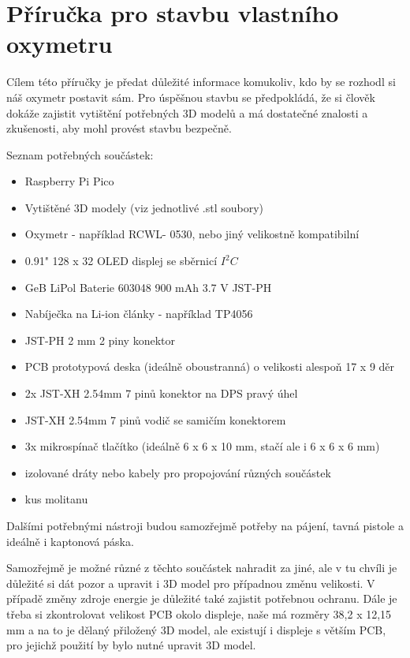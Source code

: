 \section{Příručka pro stavbu vlastního oxymetru}
\label{appn:Guide}
Cílem této příručky je předat důležité informace komukoliv, kdo by se rozhodl si náš oxymetr postavit sám. Pro úspěšnou stavbu se předpokládá, že si člověk dokáže zajistit vytištění potřebných 3D modelů a má dostatečné znalosti a zkušenosti, aby mohl provést stavbu bezpečně.
\par Seznam potřebných součástek:
\begin{itemize}
  \item Raspberry Pi Pico
  \item Vytištěné 3D modely (viz jednotlivé .stl soubory)
  \item Oxymetr - například RCWL- 0530, nebo jiný velikostně kompatibilní 
  \item 0.91" 128 x 32 OLED displej se sběrnicí $I^2C$
  \item GeB LiPol Baterie 603048 900 mAh 3.7 V JST-PH
  \item Nabíječka na Li-ion články - například TP4056
  \item JST-PH 2 mm 2 piny konektor
  \item PCB prototypová deska (ideálně oboustranná) o velikosti alespoň 17 x 9 děr
  \item 2x JST-XH 2.54mm 7 pinů konektor na DPS pravý úhel
  \item JST-XH 2.54mm 7 pinů vodič se samičím konektorem
  \item 3x mikrospínač tlačítko (ideálně 6 x 6 x 10 mm, stačí ale i 6 x 6 x 6 mm)
  \item izolované dráty nebo kabely pro propojování různých součástek
  \item kus molitanu
\end{itemize}
\par Dalšími potřebnými nástroji budou samozřejmě potřeby na pájení, tavná pistole a ideálně i kaptonová páska.
\par Samozřejmě je možné různé z těchto součástek nahradit za jiné, ale v tu chvíli je důležité si dát pozor a upravit i 3D model pro případnou změnu velikosti. V případě změny zdroje energie je důležité také zajistit potřebnou ochranu. Dále je třeba si zkontrolovat velikost PCB okolo displeje, naše má rozměry 38,2 x 12,15 mm a na to je dělaný přiložený 3D model, ale existují i displeje s větším PCB, pro jejichž použití by bylo nutné upravit 3D model.
